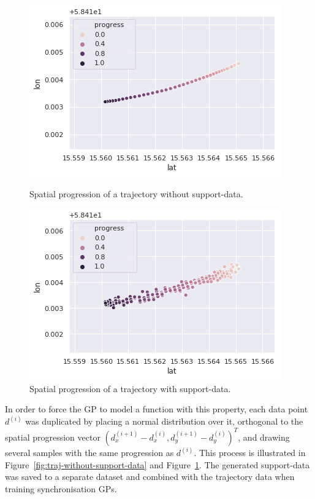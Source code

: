 \begin{figure}[H]
  \begin{minipage}{.46\textwidth}
    \includegraphics[scale=0.48,width=\textwidth]{figures/traj-without-support-data2.png}
    \caption{Spatial progression of a trajectory without support-data.}
    \label{fig:traj-without-support-data}
  \end{minipage}
  \hspace{5pt}
  \begin{minipage}{.46\textwidth}
    \includegraphics[scale=0.5,width=\textwidth]{figures/traj-with-support-data2.png}
    \caption{Spatial progression of a trajectory with support-data.}
    \label{fig:traj-with-support-data}
  \end{minipage}
\end{figure}

\noindent
In order to force the GP to model a function with this property, each
data point $d^{(i)}$ was duplicated by placing a normal distribution
over it, orthogonal to the spatial progression vector ${(d^{(i+1)}_x -
  d^{(i)}_x, d^{(i+1)}_y - d^{(i)}_y)}^T$, and drawing several samples
with the same progression as $d^{(i)}$. This process is illustrated in
Figure~\ref{fig:traj-without-support-data} and
Figure~\ref{fig:traj-with-support-data}. The generated support-data
was saved to a separate dataset and combined with the trajectory data
when training synchronisation GPs.

